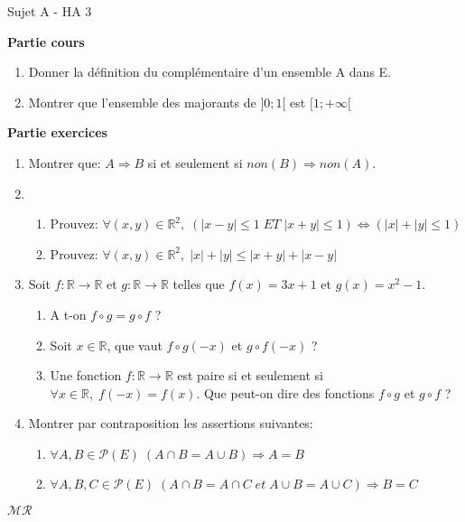 \documentclass[a4paper,11pt, landscape]{article}
\begin{document}
\begin{multicols*}{2}
\setlength{\columnsep}{1cm}
\centerline{Sujet A - HA 3}
\begin{flushleft}
  \textbf{Partie cours} 
\end{flushleft} 
\begin{enumerate}
  \item Donner la définition du complémentaire d'un ensemble A dans E.
  \item Montrer que l'ensemble des majorants de $]0; 1[$ est $[1; +\infty[$
\end{enumerate}
\textbf{Partie exercices}
\begin{enumerate}
  \item Montrer que: $A \Rightarrow B$ si et seulement si  $non (B) \Rightarrow non(A)$.
  \item 
  \begin{enumerate}
    \item Prouvez: $\forall (x, y) \in \mathbb{R}^2, \; \left(|x-y| \leq 1 \; ET \; |x+y| \leq 1 \right) \Leftrightarrow \left(|x| + |y| \leq 1 \right) $
    \item Prouvez: $\forall (x, y) \in \mathbb{R}^2, \; |x|+|y| \leq |x+y| + |x-y|$
  \end{enumerate}
  \item Soit $f: \mathbb{R} \rightarrow \mathbb{R}$ et $g: \mathbb{R} \rightarrow \mathbb{R}$ telles que $f(x) = 3x+1$ et $g(x) = x^2 - 1$.
  \begin{enumerate}
    \item A t-on $f \circ g = g \circ f$ ?
    \item Soit $x \in \mathbb{R}$, que vaut $f \circ g(-x)$ et $g \circ f (-x)$ ?
    \item Une fonction $f: \mathbb{R} \rightarrow \mathbb{R}$ est paire si et seulement si $\forall x \in \mathbb{R}, \; f(-x) = f(x)$. Que peut-on dire des fonctions $f \circ g$ et $g \circ f$ ?
  \end{enumerate} 
  \item Montrer par contraposition les assertions suivantes:
  \begin{enumerate}
    \item $\forall A, B \in \mathcal{P}(E) \; (A \cap B = A \cup B) \Rightarrow A = B$
    \item $\forall A, B, C \in \mathcal{P}(E) \; (A \cap B = A \cap C \; et \; A \cup B  = A \cup C) \Rightarrow B = C$
  \end{enumerate}
\end{enumerate}
\centerline{$\mathcal{MR}$}


\end{multicols*}
\end{document}
